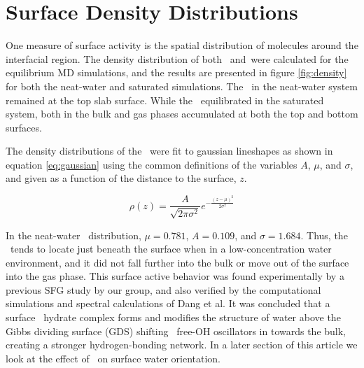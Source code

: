 \section{Surface Density Distributions}

One measure of surface activity is the spatial distribution of molecules around the interfacial region. The density distribution of both \wat~and\suldiox~were calculated for the equilibrium MD simulations, and the results are presented in figure \ref{fig:density} for both the neat-water and saturated simulations. The \suldiox~in the neat-water system remained at the top slab surface. While the \suldiox~equilibrated in the saturated system, both in the bulk and gas phases accumulated at both the top and bottom surfaces. 

The density distributions of the \suldiox~were fit to gaussian lineshapes as shown in equation \ref{eq:gaussian} using the common definitions of the variables $A$, $\mu$, and $\sigma$, and given as a function of the distance to the surface, $z$.

\begin{equation}
  \rho(z)=\frac{A}{\sqrt{2 \pi \sigma^2}} e^{-\frac{(z-\mu)^2}{2\sigma^2}}
  \label{eq:gaussian}
\end{equation}

In the neat-water \suldiox~distribution, $\mu=0.781$, $A=0.109$, and $\sigma=1.684$\angs. Thus, the \suldiox~tends to locate just beneath the surface when in a low-concentration water environment, and it did not fall further into the bulk or move out of the surface into the gas phase. This surface active behavior was found experimentally by a previous SFG study by our group,\cite{Tarbuck2005,Tarbuck2006} and also verified by the computational simulations and spectral calculations of Dang et al.\cite{Baer2010} It was concluded that a surface \suldiox~hydrate complex forms and modifies the structure of water above the Gibbs dividing surface (GDS) shifting \was~free-OH oscillators in towards the bulk, creating a stronger hydrogen-bonding network. In a later section of this article we look at the effect of \suldiox~on surface water orientation.

